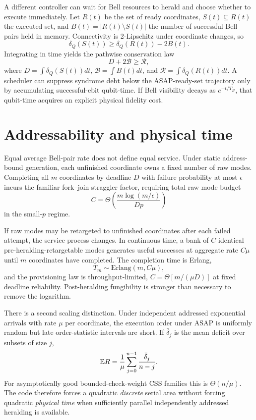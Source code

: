 \documentclass[aps,prx,reprint,superscriptaddress,nofootinbib,longbibliography,floatfix]{revtex4-2}
\begin{document}
A different controller can wait for Bell resources to herald and choose whether to execute immediately. Let $R(t)$ be the set of ready coordinates, $S(t)\subseteq R(t)$ the executed set, and $B(t)=|R(t)\setminus S(t)|$ the number of successful Bell pairs held in memory. Connectivity is 2-Lipschitz under coordinate changes, so
\begin{equation}
\delta_Q(S(t))\ge \delta_Q(R(t))-2B(t).
\end{equation}
Integrating in time yields the pathwise conservation law
\begin{equation}
D+2\mathcal B\ge \mathcal R,
\end{equation}
where $D=\int\delta_Q(S(t))dt$, $\mathcal B=\int B(t)dt$, and $\mathcal R=\int\delta_Q(R(t))dt$. A scheduler can suppress syndrome debt below the ASAP-ready-set trajectory only by accumulating successful-ebit qubit-time. If Bell visibility decays as $e^{-t/T_B}$, that qubit-time acquires an explicit physical fidelity cost.

\section{Addressability and physical time}
Equal average Bell-pair rate does not define equal service. Under static address-bound generation, each unfinished coordinate owns a fixed number of raw modes. Completing all $m$ coordinates by deadline $D$ with failure probability at most $\epsilon$ incurs the familiar fork--join straggler factor, requiring total raw mode budget
\begin{equation}
C=\Theta\!\left(\frac{m\log(m/\epsilon)}{Dp}\right)
\end{equation}
in the small-$p$ regime.

If raw modes may be retargeted to unfinished coordinates after each failed attempt, the service process changes. In continuous time, a bank of $C$ identical pre-heralding-retargetable modes generates useful successes at aggregate rate $C\mu$ until $m$ coordinates have completed. The completion time is Erlang,
\begin{equation}
T_m\sim \mathrm{Erlang}(m,C\mu),
\end{equation}
and the provisioning law is throughput-limited, $C=\Theta[m/(\mu D)]$ at fixed deadline reliability. Post-heralding fungibility is stronger than necessary to remove the logarithm.

There is a second scaling distinction. Under independent addressed exponential arrivals with rate $\mu$ per coordinate, the execution order under ASAP is uniformly random but late order-statistic intervals are short. If $\bar\delta_j$ is the mean deficit over subsets of size $j$,
\begin{equation}
\mathbb E R=\frac1\mu\sum_{j=0}^{n-1}\frac{\bar\delta_j}{n-j}.
\end{equation}
For asymptotically good bounded-check-weight CSS families this is $\Theta(n/\mu)$. The code therefore forces a quadratic \emph{discrete} serial area without forcing quadratic \emph{physical time} when sufficiently parallel independently addressed heralding is available.
\end{document}
